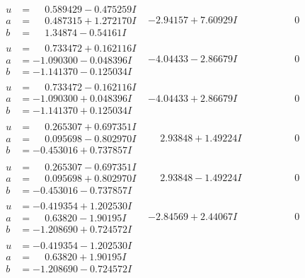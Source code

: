 \documentclass[1p]{elsarticle_modified}
\theoremstyle{definition}
\begin{document}
$$\begin{array}{c|c|c}
\begin{aligned}
u &= \phantom{-}0.589429 - 0.475259 I \\
a &= \phantom{-}0.487315 + 1.272170 I \\
b &= \phantom{-}1.34874 - 0.54161 I\end{aligned}
 & -2.94157 + 7.60929 I & \phantom{-0.000000 } 0 \\ \hline\begin{aligned}
u &= \phantom{-}0.733472 + 0.162116 I \\
a &= -1.090300 - 0.048396 I \\
b &= -1.141370 - 0.125034 I\end{aligned}
 & -4.04433 - 2.86679 I & \phantom{-0.000000 } 0 \\ \hline\begin{aligned}
u &= \phantom{-}0.733472 - 0.162116 I \\
a &= -1.090300 + 0.048396 I \\
b &= -1.141370 + 0.125034 I\end{aligned}
 & -4.04433 + 2.86679 I & \phantom{-0.000000 } 0 \\ \hline\begin{aligned}
u &= \phantom{-}0.265307 + 0.697351 I \\
a &= \phantom{-}0.095698 - 0.802970 I \\
b &= -0.453016 + 0.737857 I\end{aligned}
 & \phantom{-}2.93848 + 1.49224 I & \phantom{-0.000000 } 0 \\ \hline\begin{aligned}
u &= \phantom{-}0.265307 - 0.697351 I \\
a &= \phantom{-}0.095698 + 0.802970 I \\
b &= -0.453016 - 0.737857 I\end{aligned}
 & \phantom{-}2.93848 - 1.49224 I & \phantom{-0.000000 } 0 \\ \hline\begin{aligned}
u &= -0.419354 + 1.202530 I \\
a &= \phantom{-}0.63820 - 1.90195 I \\
b &= -1.208690 + 0.724572 I\end{aligned}
 & -2.84569 + 2.44067 I & \phantom{-0.000000 } 0 \\ \hline\begin{aligned}
u &= -0.419354 - 1.202530 I \\
a &= \phantom{-}0.63820 + 1.90195 I \\
b &= -1.208690 - 0.724572 I\end{aligned}

\end{array}$$
\end{document}

